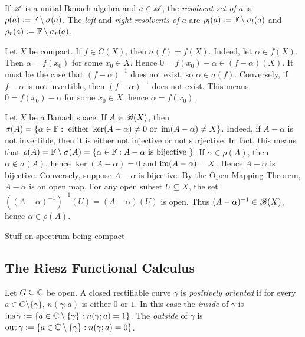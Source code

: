 \begin{definition}
	If $\mathscr{A}$ is a unital Banach algebra and $a \in \mathscr{A}$, the \emph{resolvent set of $a$} is $\rho(a) := \mathbb{F} \setminus \sigma(a)$. The \emph{left} and \emph{right resolvents of $a$} are $\rho_l(a) := \mathbb{F} \setminus \sigma_l(a)$ and $\rho_r(a) := \mathbb{F} \setminus \sigma_r(a)$.
\end{definition}

\begin{example}
	Let $X$ be compact. If $f \in C(X)$, then $\sigma(f) = f(X)$. Indeed, let $\alpha \in f(X)$. Then $\alpha = f(x_0)$ for some $x_0 \in X$. Hence $0 = f(x_0) - \alpha \in (f-\alpha)(X)$. It must be the case that $(f-\alpha)^{-1}$ does not exist, so $\alpha \in \sigma(f)$. Conversely, if $f-\alpha$ is not invertible, then $(f-\alpha)^{-1}$ does not exist. This means $0 = f(x_0) - \alpha$ for some $x_0 \in X$, hence $\alpha = f(x_0)$. 
\end{example}

\begin{example}
	Let $X$ be a Banach space. If $A \in \mathscr{B}(X)$, then $\sigma(A) = \{\alpha \in \mathbb{F} : \text{ either }\ker(A-\alpha) \neq 0\text{ or }\operatorname{im}(A-\alpha) \neq X\}$. Indeed, if $A - \alpha$ is not invertible, then it is either not injective or not surjective. In fact, this means that $\rho(A) = \mathbb{F} \setminus \sigma(A) = \{\alpha \in \mathbb{F} : A - \alpha \text{ is bijective }\}$. If $\alpha \in \rho(A)$, then $\alpha \not\in \sigma(A)$, hence $\ker(A - \alpha) = 0$ and $\operatorname{im}(A - \alpha) = X$. Hence $A - \alpha$ is bijective. Conversely, suppose $A - \alpha$ is bijective. By the Open Mapping Theorem, $A-\alpha$ is an open map. For any open subset $U \subseteq X$, the set $((A-\alpha)^{-1})^{-1}(U) = (A-\alpha)(U)$ is open. Thus $(A-\alpha)^{-1} \in \mathscr{B}(X)$, hence $\alpha \in \rho(A)$.
\end{example}

{\color{red} Stuff on spectrum being compact}

\subsection{The Riesz Functional Calculus}

\begin{definition}
	Let $G \subseteq \mathbb{C}$ be open. A closed rectifiable curve $\gamma$ is \emph{positively oriented} if for every $a \in G \setminus \{\gamma\}$, $n(\gamma;a)$ is either $0$ or $1$. In this case the \emph{inside} of $\gamma$ is $\operatorname{ins} \gamma := \{a \in \mathbb{C} \setminus \{\gamma\} : n(\gamma;a) = 1\}$. The \emph{outside} of $\gamma$ is $\operatorname{out} \gamma := \{a \in \mathbb{C} \setminus \{\gamma\}: n(\gamma;a) = 0\}$.
\end{definition}


